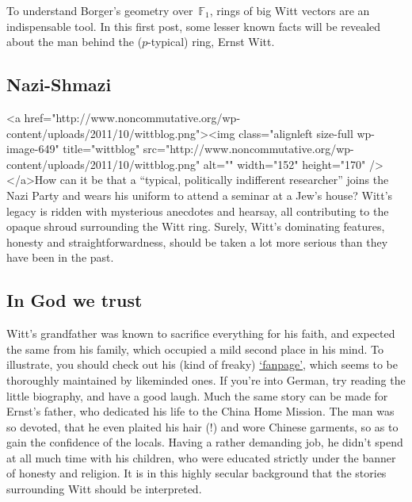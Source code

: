 To understand Borger's geometry over~${\mathbb{F}_{1}}$, rings of big Witt vectors are an indispensable tool. In this first post, some lesser known facts will be revealed about the man behind the ($p$-typical) ring, Ernst Witt.

\subsection{Nazi-Shmazi}
<a href="http://www.noncommutative.org/wp-content/uploads/2011/10/wittblog.png"><img class="alignleft size-full wp-image-649" title="wittblog" src="http://www.noncommutative.org/wp-content/uploads/2011/10/wittblog.png" alt="" width="152" height="170" /></a>How can it be that a ``typical, politically indifferent researcher'' joins the Nazi Party and wears his uniform to attend a seminar at a Jew's house? Witt's legacy is ridden with mysterious anecdotes and hearsay, all contributing to the opaque shroud surrounding the Witt ring. Surely, Witt's dominating features, honesty and straightforwardness, should be taken a lot more serious than they have been in the past.

\subsection{In God we trust}
Witt's grandfather was known to sacrifice everything for his faith, and expected the same from his family, which occupied a mild second place in his mind. To illustrate, you should check out his (kind of freaky) \href{http://www.norddeutsche-lehrer-gemeinschaft.de/heinrich-witt.html}{`fanpage'}, which seems to be thoroughly maintained by likeminded ones. If you're into German, try reading the little biography, and have a good laugh. Much the same story can be made for Ernst's father, who dedicated his life to the China Home Mission. The man was so devoted, that he even plaited his hair (!) and wore Chinese garments, so as to gain the confidence of the locals. Having a rather demanding job, he didn't spend at all much time with his children, who were educated strictly under the banner of honesty and religion. It is in this highly secular background that the stories surrounding Witt should be interpreted.

